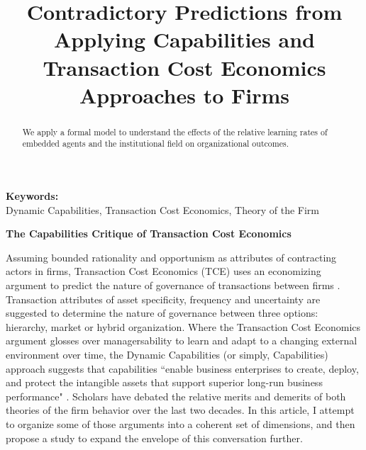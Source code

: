 \documentclass[12pt,letterpaper]{article}
\begin{document}
\title{Contradictory Predictions from Applying Capabilities and Transaction Cost Economics Approaches to Firms}
\date{}
\maketitle

\begin{abstract} 
\normalsize 
We apply a formal model to understand the effects of the relative learning rates of embedded agents and the institutional field on organizational outcomes. 
\end{abstract}


{\textbf{Keywords:} \\\indent Dynamic Capabilities, Transaction Cost Economics, Theory of the Firm}

\newpage
\pagestyle{fancy}
\fancyhf{}
\rhead{\thepage}

\begin{center}
\textbf{The Capabilities Critique of Transaction Cost Economics}
\end{center}

Assuming bounded rationality and opportunism as attributes of contracting actors in firms, Transaction Cost Economics (TCE) uses an economizing argument to predict the nature of governance of transactions between firms \citep{Williamson1985}.  Transaction attributes of asset specificity, frequency and uncertainty are suggested to determine the nature of governance between three options: hierarchy, market or hybrid organization. Where the Transaction Cost Economics argument glosses over managers\textquotesingle ability to learn and adapt to a changing external environment over time, the Dynamic Capabilities (or simply, Capabilities) approach suggests that capabilities ``enable business enterprises to create, deploy, and protect the intangible assets that support superior long-run business performance" \citep{Teece2007}. Scholars have debated the relative merits and demerits of both theories of the firm behavior over the last two decades. In this article, I attempt to organize some of those arguments into a coherent set of dimensions, and then propose a study to expand the envelope of this conversation further.
\end{document}
